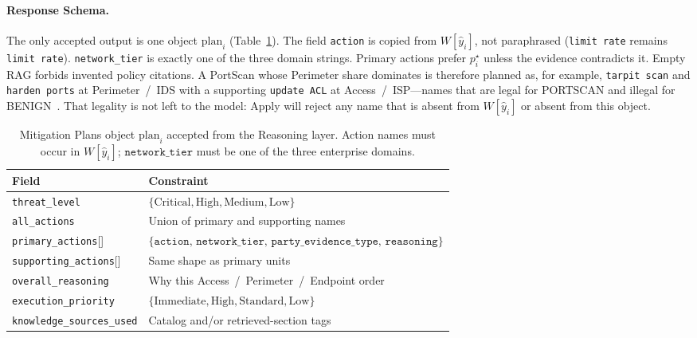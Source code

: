 \paragraph{Response Schema.}
The only accepted output is one object $\mathrm{plan}_i$ (Table~\ref{tab:plan-schema}). The field \texttt{action} is copied from $W[\hat{y}_i]$, not paraphrased (\texttt{limit rate} remains \texttt{limit rate}). \texttt{network\_tier} is exactly one of the three domain strings. Primary actions prefer $p_i^{\star}$ unless the evidence contradicts it. Empty RAG forbids invented policy citations. A PortScan whose Perimeter share dominates is therefore planned as, for example, \texttt{tarpit scan} and \texttt{harden ports} at Perimeter~/~IDS with a supporting \texttt{update ACL} at Access~/~ISP---names that are legal for PORTSCAN and illegal for BENIGN~\cite{sharafaldin2018}. That legality is not left to the model: Apply will reject any name that is absent from $W[\hat{y}_i]$ or absent from this object.

\begin{table}[t]
\caption{Mitigation Plans object $\mathrm{plan}_i$ accepted from the Reasoning layer. Action names must occur in $W[\hat{y}_i]$; $\mathtt{network\_tier}$ must be one of the three enterprise domains.}
\label{tab:plan-schema}
\centering
\begin{tabular}{p{}p{}}
\hline
Field & Constraint \\
\hline
\texttt{threat\_level} & $\{\mathrm{Critical},\mathrm{High},\mathrm{Medium},\mathrm{Low}\}$ \\
\texttt{all\_actions} & Union of primary and supporting names \\
\texttt{primary\_actions}[] & $\{\mathtt{action},\,\mathtt{network\_tier},\,\mathtt{party\_evidence\_type},\,\mathtt{reasoning}\}$ \\
\texttt{supporting\_actions}[] & Same shape as primary units \\
\texttt{overall\_reasoning} & Why this Access~/~Perimeter~/~Endpoint order \\
\texttt{execution\_priority} & $\{\mathrm{Immediate},\mathrm{High},\mathrm{Standard},\mathrm{Low}\}$ \\
\texttt{knowledge\_sources\_used} & Catalog and/or retrieved-section tags \\
\hline
\end{tabular}
\end{table}

